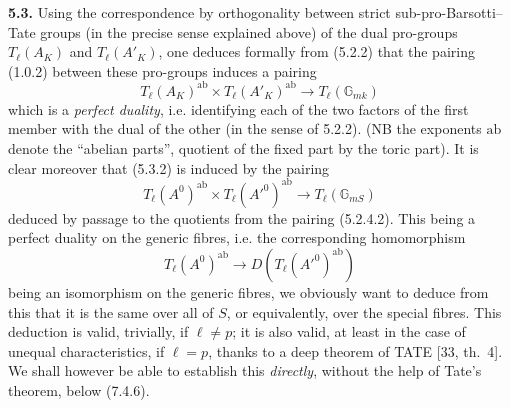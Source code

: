\documentclass[11pt]{article}
\theoremstyle{plain}
\theoremstyle{definition}
\theoremstyle{remark}
\newcommand{\GG}{\mathbb G}
\newcommand{\Tl}{T_\ell}
\newcommand{\ab}{\mathrm{ab}}
\begin{document}
\noindent\textbf{5.3.} Using the correspondence by orthogonality between
strict sub-pro-Barsotti--Tate groups (in the precise sense explained
above) of the dual pro-groups $\Tl(A_K)$ and $\Tl(A'_K)$, one deduces
formally from (5.2.2) that the pairing (1.0.2) between these pro-groups
induces a pairing
\begin{equation}
\Tl(A_K)^{\ab} \times \Tl(A'_K)^{\ab} \longrightarrow
\Tl(\GG_{mk})
\end{equation}
which is a \emph{perfect duality}, i.e. identifying each of the two
factors of the first member with the dual of the other (in the sense of
5.2.2). (NB the exponents $\ab$ denote the ``abelian parts'', quotient
of the fixed part by the toric part). It is clear moreover that (5.3.2)
is induced by the pairing
\begin{equation}
\Tl(A^0)^{\ab} \times \Tl(A'^0)^{\ab} \longrightarrow
\Tl(\GG_{mS})
\end{equation}
deduced by passage to the quotients from the pairing (5.2.4.2). This
being a perfect duality on the generic fibres, i.e. the corresponding
homomorphism
\begin{equation}
\Tl(A^0)^{\ab} \longrightarrow D(\Tl(A'^0)^{\ab})
\end{equation}
being an isomorphism on the generic fibres, we obviously want to deduce
from this that it is the same over all of $S$, or equivalently, over
the special fibres. This deduction is valid, trivially, if $\ell \neq p$;
it is also valid, at least in the case of unequal characteristics, if
$\ell = p$, thanks to a deep theorem of TATE [33, th.~4]. We shall
however be able to establish this \emph{directly}, without the help of
Tate's theorem, below (7.4.6).
\end{document}
